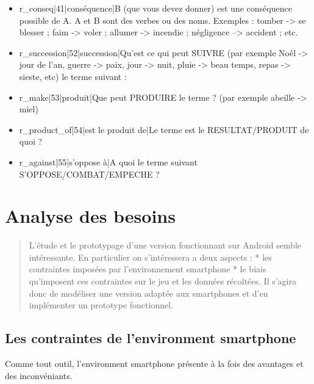\documentclass[a4paper,11pt,french]{article}
\begin{document}
\begin{itemize}
\item r\_conseq|41|conséquence|B (que vous devez donner) est une conséquence possible de A. A et B sont des verbes ou des noms.  Exemples : tomber -> se blesser ; faim -> voler ; allumer -> incendie ; négligence --> accident ; etc.

\item r\_succession|52|succession|Qu'est ce qui peut SUIVRE (par exemple Noêl -> jour de l'an, guerre -> paix, jour -> nuit,  pluie -> beau temps, repas -> sieste, etc) le terme suivant :

\item r\_make|53|produit|Que peut PRODUIRE le terme ? (par exemple abeille -> miel)

\item r\_product\_of|54|est le produit de|Le terme est le RESULTAT/PRODUIT de quoi ?

\item r\_against|55|s'oppose à|A quoi le terme suivant S'OPPOSE/COMBAT/EMPECHE ?

\end{itemize}



\section{Analyse des besoins}



\begin{quotation}
L'étude et le prototypage d'une version fonctionnant sur Android semble intéressante. En particulier on s'intéressera a deux aspects : * les contraintes imposées par l'environnement smartphone * le biais qu'imposent ces contraintes sur le jeu et les données récoltées. Il s'agira donc de modéliser une version adaptée aux smartphones et d'en implémenter un prototype fonctionnel. 
\end{quotation}

\subsection{Les contraintes de l'environment smartphone}

Comme tout outil, l'environment smartphone présente à la fois des avantages et des inconvéniants. 
\end{document}

